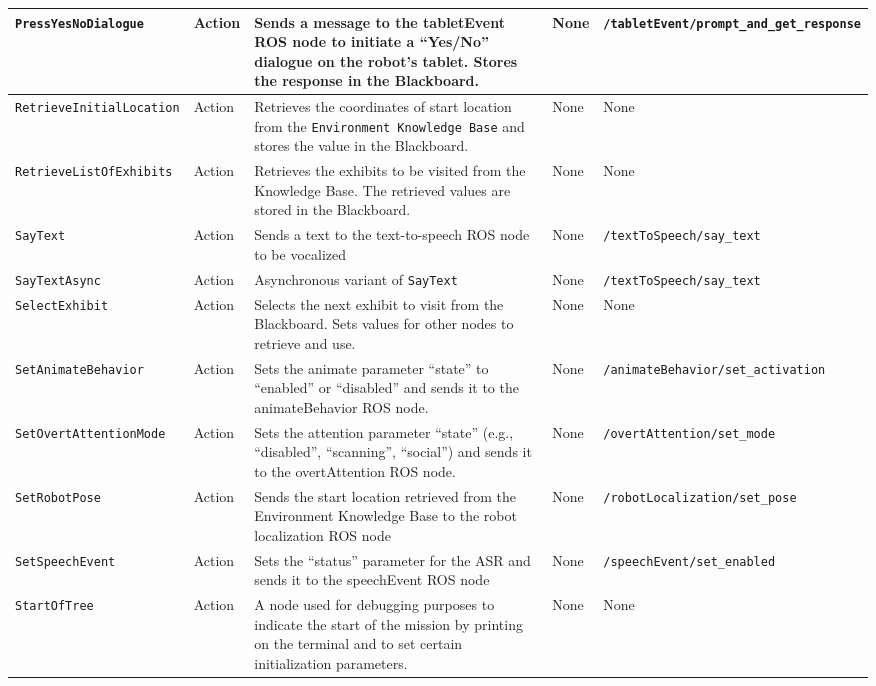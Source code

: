 \documentclass{CSSRforAfrica}
\begin{document}
\begin{landscape}
{\begin{longtable}[c]{|p{4.8cm}|p{1.4cm}|p{4cm}|p{3.8cm}|p{6.6cm}|}
    \texttt{\footnotesize PressYesNoDialogue} & Action & Sends a message to the tabletEvent ROS node to initiate a ``Yes/No'' dialogue on the robot's tablet. Stores the response in the Blackboard. & None & \texttt{\footnotesize /tabletEvent/prompt\_and\_get\_response} \\ \hline
    \texttt{\footnotesize RetrieveInitialLocation} & Action & Retrieves the coordinates of start location from the \texttt{\footnotesize Environment Knowledge Base} and stores the value in the Blackboard. & None & None \\ \hline
    \texttt{\footnotesize RetrieveListOfExhibits} & Action & Retrieves the exhibits to be visited from the Knowledge Base. The retrieved values are stored in the Blackboard. & None & None \\ \hline
    \texttt{\footnotesize SayText} & Action & Sends a text to the text-to-speech ROS node to be vocalized & None & \texttt{\footnotesize /textToSpeech/say\_text} \\ \hline
    \texttt{\footnotesize SayTextAsync} & Action & Asynchronous variant of \texttt{\footnotesize SayText} & None & \texttt{\footnotesize /textToSpeech/say\_text} \\ \hline
    \texttt{\footnotesize SelectExhibit} & Action & Selects the next exhibit to visit from the Blackboard. Sets values for other nodes to retrieve and use. & None & None \\ \hline
    \texttt{\footnotesize SetAnimateBehavior} & Action & Sets the animate parameter ``state'' to ``enabled'' or ``disabled'' and sends it to the animateBehavior ROS node. & None & \texttt{\footnotesize /animateBehavior/set\_activation} \\ \hline
    \texttt{\footnotesize SetOvertAttentionMode} & Action & Sets the attention parameter ``state'' (e.g., ``disabled'', ``scanning'', ``social'') and sends it to the overtAttention ROS node. & None & \texttt{\footnotesize /overtAttention/set\_mode} \\ \hline
    \texttt{\footnotesize SetRobotPose} & Action & Sends the start location retrieved from the Environment Knowledge Base to the robot localization ROS node & None & \texttt{\footnotesize /robotLocalization/set\_pose} \\ \hline
    \texttt{\footnotesize SetSpeechEvent} & Action & Sets the ``status'' parameter for the ASR and sends it to the speechEvent ROS node & None & \texttt{\footnotesize /speechEvent/set\_enabled} \\ \hline
    \texttt{\footnotesize StartOfTree} & Action & A node used for debugging purposes to indicate the start of the mission by printing on the terminal and to set certain initialization parameters. & None & None \\ \hline
\end{longtable}
}
\end{landscape}
\end{document}

